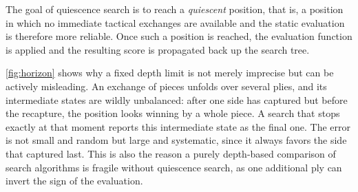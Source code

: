 The goal of quiescence search is to reach a \emph{quiescent} position, that is, a
position in which no immediate tactical exchanges are available and the static
evaluation is therefore more reliable. Once such a position is reached, the
evaluation function is applied and the resulting score is propagated back up the
search tree.

\cref{fig:horizon} shows why a fixed depth limit is not merely imprecise but can
be actively misleading. An exchange of pieces unfolds over several plies, and its
intermediate states are wildly unbalanced: after one side has captured but before
the recapture, the position looks winning by a whole piece. A search that stops
exactly at that moment reports this intermediate state as the final one. The
error is not small and random but large and systematic, since it always favors
the side that captured last. This is also the reason a purely depth-based
comparison of search algorithms is fragile without quiescence search, as one
additional ply can invert the sign of the evaluation.

